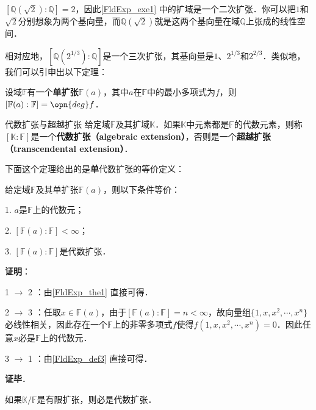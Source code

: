 $[\mathbb{Q}(\sqrt{2}):\mathbb{Q}]=2$，因此\autoref{FldExp_exe1} 中的扩域是一个二次扩张．你可以把$1$和$\sqrt{2}$分别想象为两个基向量，而$\mathbb{Q}(\sqrt{2})$就是这两个基向量在域$\mathbb{Q}$上张成的线性空间．

相对应地，$[\mathbb{Q}(2^{1/3}):\mathbb{Q}]$是一个三次扩张，其基向量是$1$、$2^{1/3}$和$2^{2/3}$．类似地，我们可以引申出以下定理：




\begin{theorem}{}\label{FldExp_the1}
设域$\mathbb{F}$有一个\textbf{单扩张}$\mathbb{F}(a)$，其中$a$在$\mathbb{F}$中的最小多项式为$f$，则$[\mathbb{F}(a):\mathbb{F}]=\opn{deg}f$．
\end{theorem}




\begin{definition}{代数扩张与超越扩张}\label{FldExp_def4}\label{FldExp_def3}
给定域$\mathbb{F}$及其扩域$\mathbb{K}$．如果$\mathbb{K}$中元素都是$\mathbb{F}$的代数元素，则称$[\mathbb{K}:\mathbb{F}]$是一个\textbf{代数扩张（algebraic extension）}，否则是一个\textbf{超越扩张（transcendental extension）}．
\end{definition}

下面这个定理给出的是\textbf{单}代数扩张的等价定义：

\begin{theorem}{}\label{FldExp_the2}
给定域$\mathbb{F}$及其单扩张$\mathbb{F}(a)$，则以下条件等价：

1. $a$是$\mathbb{F}$上的代数元；

2. $[\mathbb{F}(a):\mathbb{F}]<\infty$；

3. $[\mathbb{F}(a):\mathbb{F}]$是代数扩张．

\end{theorem}


\textbf{证明}：

1 $\to$ 2 ：由\autoref{FldExp_the1} 直接可得．

2 $\to$ 3 ：任取$x\in\mathbb{F}(a)$，由于$[\mathbb{F}(a):\mathbb{F}]=n<\infty$，故向量组$\{1, x, x^2, \cdots, x^n\}$必线性相关，因此存在一个$\mathbb{F}$上的非零多项式$f$使得$f(1, x, x^2, \cdots, x^n)=0$．因此任意$x$必是$\mathbb{F}$上的代数元．

3 $\to$ 1 ：由\autoref{FldExp_def3} 直接可得．

\textbf{证毕}．

\begin{corollary}{}\label{FldExp_cor1}
如果$\mathbb{K}/\mathbb{F}$是有限扩张，则必是代数扩张．
\end{corollary}

